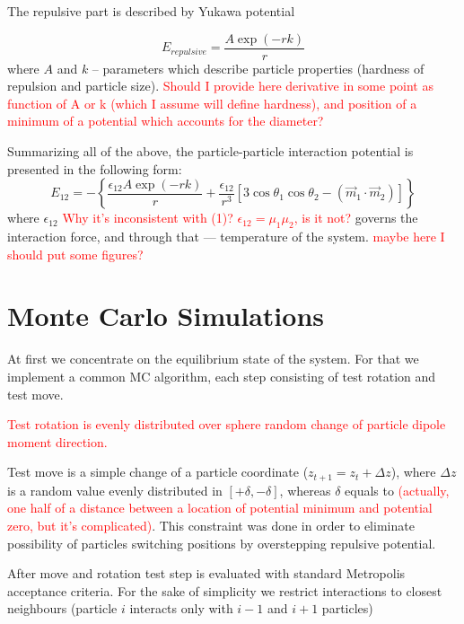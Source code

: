 \documentclass[12pt,a4paper]{article}
\begin{document}
The repulsive part is described by Yukawa potential

\label{eq_yukawa_interaction}
\begin{equation}
E_{repulsive} = \frac{A \exp(-r k)}{r}
\end{equation}
where $A$ and $k$ -- parameters which describe particle properties (hardness of repulsion and particle size). \textcolor{red}{Should I provide here derivative in some point as function of A or k (which I assume will define hardness), and position of a minimum of a potential which accounts for the diameter?}

Summarizing all of the above, the particle-particle interaction potential is presented in the following form:
\label{eq_full_particle_particle_interraction}
\begin{equation}
E_{12} = -\left\{ \frac{\epsilon_{12} A \exp(-r k)}{r} +  \frac{\epsilon_{12}}{r^3} [3 \cos \theta_1 \cos \theta_2 - (\vec{m}_1 \cdot \vec{m}_2)]\right\}
\end{equation}
where $\epsilon_{12}$ \textcolor{red}{Why it's inconsistent with (1)? $\epsilon_{12} = \mu_1\mu_2$, is it not?} governs the interaction force, and through that --- temperature of the system. \textcolor{red}{maybe here I should put some figures?}

\section{Monte Carlo Simulations}

At first we concentrate on the equilibrium state of the system. For that we implement a common MC algorithm, each step consisting of test rotation and test move.

\textcolor{red}{Test rotation is evenly distributed over sphere random change of particle dipole moment direction.}

Test move is a simple change of a particle coordinate ($z_{t+1} = z_t + \Delta z$), where $\Delta z$ is a random value evenly distributed in $[+\delta, -\delta]$, whereas $\delta$ equals to \textcolor{red}{(actually, one half of a distance between a location of potential minimum and potential zero, but it's complicated)}. This constraint was done in order to eliminate possibility of particles switching positions by overstepping repulsive potential.

After move and rotation test step is evaluated with standard Metropolis acceptance criteria. For the sake of simplicity we restrict interactions to closest neighbours (particle $i$ interacts only with $i-1$ and $i+1$ particles) 
\end{document}
